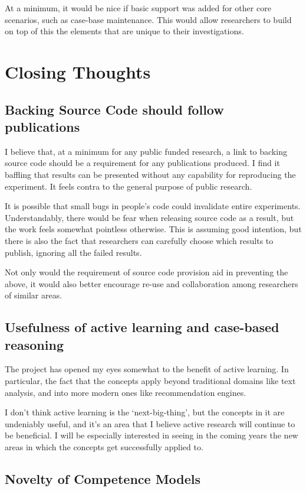 \documentclass[a4paper,11pt]{report}
\begin{document}
At a minimum, it would be nice if basic support was added for other core scenarios, such as case-base maintenance. This would allow researchers to build on top of this the elements that are unique to their investigations.

\section{Closing Thoughts}
\subsection{Backing Source Code should follow publications}
I believe that, at a minimum for any public funded research, a link to backing source code should be a requirement for any publications produced. I find it baffling that results can be presented without any capability for reproducing the experiment. It feels contra to the general purpose of public research.

It is possible that small bugs in people's code could invalidate entire experiments. Understandably, there would be fear when releasing source code as a result, but the work feels somewhat pointless otherwise. This is assuming good intention, but there is also the fact that researchers can carefully choose which results to publish, ignoring all the failed results.

Not only would the requirement of source code provision aid in preventing the above, it would also better encourage re-use and collaboration among researchers of similar areas.

\subsection{Usefulness of active learning and case-based reasoning}

The project has opened my eyes somewhat to the benefit of active learning. In particular, the fact that the concepts apply beyond traditional domains like text analysis, and into more modern ones like recommendation engines.

I don't think active learning is the `next-big-thing', but the concepts in it are undeniably useful, and it's an area that I believe active research  will continue to be beneficial. I will be especially interested in seeing in the coming years the new areas in which the concepts get successfully applied to.

\subsection{Novelty of Competence Models}
\end{document}
